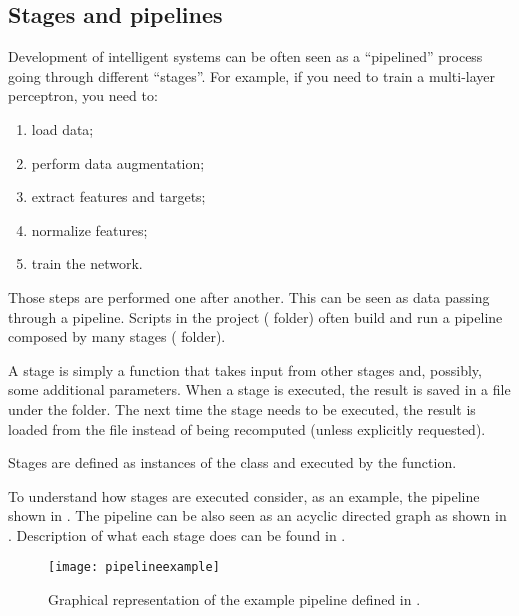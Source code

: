 \subsection{Stages and pipelines}\label{subsec:stages}

Development of intelligent systems can be often seen as a ``pipelined'' process
going through different ``stages''. For example, if you need to train a
multi-layer perceptron, you need to:
\begin{enumerate}
	\item load data;
	\item perform data augmentation;
	\item extract features and targets;
	\item normalize features;
	\item train the network.
\end{enumerate}
Those steps are performed one after another. This can be seen as data passing
through a pipeline. Scripts in the project ( folder) often
build and run a pipeline composed by many stages ( folder).

A stage is simply a function that takes input from other stages and, possibly,
some additional parameters. When a stage is executed, the result is saved in a
file under the  folder. The next time the stage needs to be
executed, the result is loaded from the file instead of being recomputed
(unless explicitly requested).

Stages are defined as instances of the class  and executed by the
 function.

To understand how stages are executed consider, as an example, the pipeline
shown in . The pipeline can be also seen as an
acyclic directed graph as shown in . Description of
what each stage does can be found in .



\begin{figure}[htbp]
	\centering
	\texttt{[image: pipelineexample]}
	\caption{Graphical representation of the example pipeline defined in
	.}\label{fig:pipelineexample}
\end{figure}

